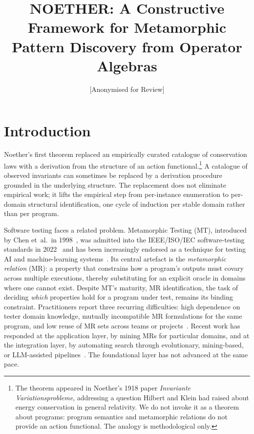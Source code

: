 \documentclass[acmsmall, screen]{acmart}
\title{NOETHER: A Constructive Framework for Metamorphic Pattern Discovery from Operator Algebras}
\author{[Anonymised for Review]}
\affiliation{%
  \institution{[Anonymised]}
  \city{[Anonymised]}
  \country{[Anonymised]}
}
\begin{document}
\maketitle

\section{Introduction}
\label{sec:intro}

Noether's first theorem replaced an empirically curated catalogue of conservation laws with a derivation from the structure of an action functional.\footnote{The theorem appeared in Noether's 1918 paper \emph{Invariante Variationsprobleme}, addressing a question Hilbert and Klein had raised about energy conservation in general relativity. We do not invoke it as a theorem about programs: program semantics and metamorphic relations do not provide an action functional. The analogy is methodological only.} A catalogue of observed invariants can sometimes be replaced by a derivation procedure grounded in the underlying structure. The replacement does not eliminate empirical work; it lifts the empirical step from per-instance enumeration to per-domain structural identification, one cycle of induction per stable domain rather than per program.

Software testing faces a related problem. Metamorphic Testing (MT), introduced by Chen et~al.\ in 1998~\cite{Chen1998}, was admitted into the IEEE/ISO/IEC software-testing standards in 2022~\cite{ISO29119} and has been increasingly endorsed as a technique for testing AI and machine-learning systems~\cite{Segura2016, LiTOSEM2025}. Its central artefact is the \emph{metamorphic relation} (MR): a property that constrains how a program's outputs must covary across multiple executions, thereby substituting for an explicit oracle in domains where one cannot exist. Despite MT's maturity, MR identification, the task of deciding \emph{which} properties hold for a program under test, remains its binding constraint. Practitioners report three recurring difficulties: high dependence on tester domain knowledge, mutually incompatible MR formulations for the same program, and low reuse of MR sets across teams or projects~\cite{Segura2016, LiTOSEM2025}. Recent work has responded at the application layer, by mining MRs for particular domains, and at the integration layer, by automating search through evolutionary, mining-based, or LLM-assisted pipelines~\cite{MRScout2024, GenMorph2024, Shin2024}. The foundational layer has not advanced at the same pace.
\end{document}
